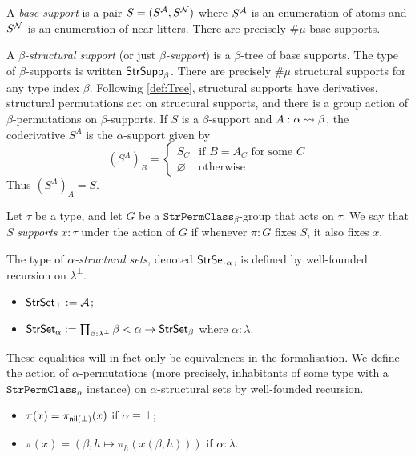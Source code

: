 \begin{definition}[support]
  \label{def:StrSupport}
  A \emph{base support} is a pair \( S = (S^{\mathcal A}, S^{\mathcal N}) \) where \( S^{\mathcal A} \) is an enumeration of atoms and \( S^{\mathcal N} \) is an enumeration of near-litters.
  There are precisely \( \#\mu \) base supports.

  A \emph{\( \beta \)-structural support} (or just \emph{\( \beta \)-support}) is a \( \beta \)-tree of base supports.
  The type of \( \beta \)-supports is written \( \mathsf{StrSupp}_\beta \).
  There are precisely \( \#\mu \) structural supports for any type index \( \beta \).
  Following \cref{def:Tree}, structural supports have derivatives, structural permutations act on structural supports, and there is a group action of \( \beta \)-permutations on \( \beta \)-supports.
  If \( S \) is a \( \beta \)-support and \( A : \alpha \rightsquigarrow \beta \), the coderivative \( S^A \) is the \( \alpha \)-support given by
  \[ (S^A)_B = \begin{cases}
    S_C & \text{if } B = A_C \text{ for some } C \\
    \varnothing & \text{otherwise}
  \end{cases} \]
  Thus \( (S^A)_A = S \).

  Let \( \tau \) be a type, and let \( G \) be a \( \texttt{StrPermClass}_\beta \)-group that acts on \( \tau \).
  We say that \( S \) \emph{supports} \( x : \tau \) under the action of \( G \) if whenever \( \pi : G \) fixes \( S \), it also fixes \( x \).
\end{definition}
\begin{definition}
  \label{def:StrSet}
  The type of \emph{\( \alpha \)-structural sets}, denoted \( \mathsf{StrSet}_\alpha \), is defined by well-founded recursion on \( \lambda^\bot \).
  \begin{itemize}
    \item \( \mathsf{StrSet}_\bot := {\mathcal A} \);
    \item \( \mathsf{StrSet}_\alpha := \prod_{\beta : \lambda^\bot} \beta < \alpha \to \mathsf{StrSet}_\beta \) where \( \alpha : \lambda \).
  \end{itemize}
  These equalities will in fact only be equivalences in the formalisation.
  We define the action of \( \alpha \)-permutations (more precisely, inhabitants of some type with a \( \texttt{StrPermClass}_\alpha \) instance) on \( \alpha \)-structural sets by well-founded recursion.
  \begin{itemize}
    \item \( \pi(x) = \pi_{\operatorname{\mathsf{nil}}(\bot)}(x) \) if \( \alpha \equiv \bot \);
    \item \( \pi(x) = (\beta, h \mapsto \pi_h(x(\beta, h))) \) if \( \alpha : \lambda \).
  \end{itemize}
\end{definition}


